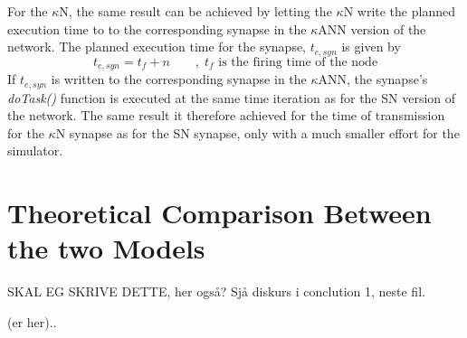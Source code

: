 		For the $\kappa$N, the same result can be achieved by letting the $\kappa$N write the planned execution time to to the corresponding synapse in the $\kappa$ANN version of the network.
		The planned execution time for the synapse, $t_{e, syn}$ is given by
		\begin{equation}
			t_{e,syn} = t_f+n \qquad, \; \text{$t_f$ is the firing time of the node}
		\end{equation}
		If $t_{e, syn}$ is written to the corresponding synapse in the $\kappa$ANN, the synapse's \emph{doTask()} function is executed at the same time iteration as for the SN version of the network.
		The same result it therefore achieved for the time of transmission for the $\kappa$N synapse as for the SN synapse, only with a much smaller effort for the simulator.







\section{Theoretical Comparison Between the two Models}
SKAL EG SKRIVE DETTE, her også? Sjå diskurs i conclution 1, neste fil.

(er her)..		



